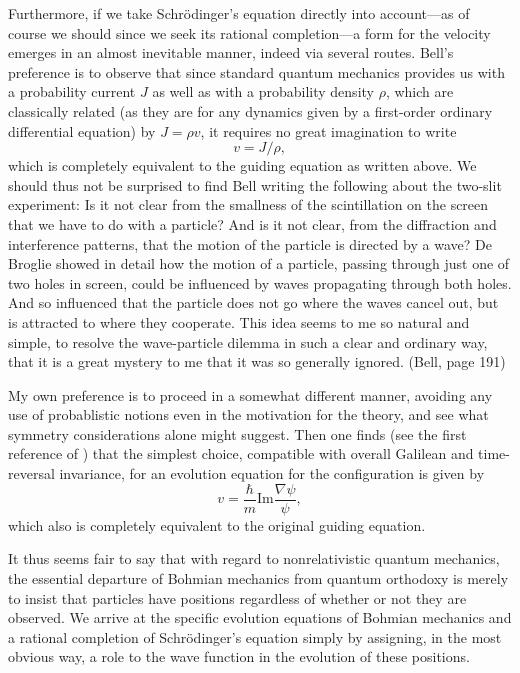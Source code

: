 Furthermore, if we take Schr\"odinger's equation directly into account---as
of course we should since we seek its rational completion---a form for the
velocity emerges in an almost inevitable manner, indeed via several routes.
Bell's preference is to observe that since standard quantum mechanics
provides us with a probability current $J$ as well as with a probability
density $\rho$, which are classically related (as they are for any dynamics
given by a first-order ordinary differential equation) by $J=\rho v$, it
requires no great imagination to write $$v=J/\rho,$$ which is completely
equivalent to the guiding equation as written above. We should thus not be
surprised to find Bell writing the following about the two-slit experiment:
\bq \noindent Is it not clear from the smallness of the scintillation on
the screen that we have to do with a particle? And is it not clear, from
the diffraction and interference patterns, that the motion of the particle
is directed by a wave? De Broglie showed in detail how the motion of a
particle, passing through just one of two holes in screen, could be
influenced by waves propagating through both holes.    And so influenced
that the particle does not go where the waves cancel out, but is attracted
to where they cooperate. This idea seems to me so natural and simple, to
resolve the wave-particle dilemma  in such a clear and ordinary way, that
it is a great mystery to me that it was so generally ignored. (Bell, page 191)
\eq


My own preference is to proceed in a somewhat different manner, avoiding
any use of probablistic notions even in the motivation for the theory, and
see what symmetry considerations alone might suggest. Then one finds (see
the first reference of \cite{DGZ})
that the simplest choice, compatible with overall Galilean and
time-reversal invariance, for an evolution equation for the configuration
is given by $$v=\frac {\hbar}m\mbox {Im}\frac{\nabla \psi}{\psi},$$ which
also is completely equivalent to the original guiding equation.

It thus seems fair to say that with regard to nonrelativistic quantum
mechanics, the essential departure of Bohmian mechanics from quantum
orthodoxy is merely to insist that particles have positions regardless of
whether or not they are observed. We arrive at the specific evolution
equations of Bohmian mechanics and a rational completion of Schr\"odinger's
equation simply by assigning, in the most obvious way, a role to the wave
function in the evolution of these positions.

